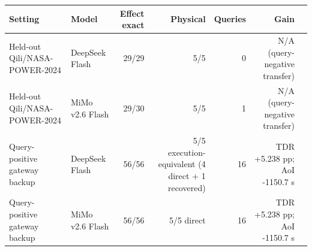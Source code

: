 \begin{tabular}{p{}p{}rrrrp{}}
\toprule
Setting & Model & Effect exact & Physical & Queries & Gain \\
\midrule
Held-out Qili/NASA-POWER-2024 & DeepSeek Flash & 29/29 & 5/5 & 0 & N/A (query-negative transfer) \\
Held-out Qili/NASA-POWER-2024 & MiMo v2.6 Flash & 29/30 & 5/5 & 1 & N/A (query-negative transfer) \\
Query-positive gateway backup & DeepSeek Flash & 56/56 & 5/5 execution-equivalent (4 direct + 1 recovered) & 16 & TDR +5.238 pp; AoI -1150.7 s \\
Query-positive gateway backup & MiMo v2.6 Flash & 56/56 & 5/5 direct & 16 & TDR +5.238 pp; AoI -1150.7 s \\
\bottomrule
\end{tabular}
